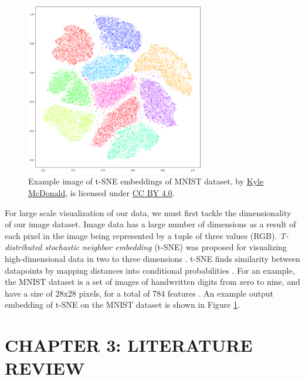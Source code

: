 \documentclass[12pt]{article}
\begin{document}
\begin{figure}[h]
    \centering
    \includegraphics[width=0.7\textwidth]{assets/images/tsne.png}
    \caption{Example image of t-SNE embeddings of MNIST dataset,
        by \href{https://www.flickr.com/photos/kylemcdonald/26620503329/}{Kyle
            McDonald}, is licensed under
        \href{https://creativecommons.org/licenses/by/4.0/}{CC BY 4.0}.}
    \label{fig:tsne}
\end{figure}

For large scale visualization of our data, we must first tackle the
dimensionality of our image dataset. Image data has a large number of dimensions
as a result of each pixel in the image being represented by a tuple of three
values (RGB). \textit{T-distributed stochastic neighbor embedding} (t-SNE) was
proposed for visualizing high-dimensional data in two to three dimensions
\cite{maaten_visualizing_2008}. t-SNE finds similarity between datapoints by
mapping distances into conditional probabilities \cite{maaten_visualizing_2008}.
For an example, the MNIST dataset is a set of images of handwritten digits from
zero to nine, and have a size of 28x28 pixels, for a total of 784 features
\cite{deng_mnist_2012}. An example output embedding of t-SNE on the
MNIST dataset is shown in Figure \ref{fig:tsne}.

\clearpage
\section{CHAPTER 3: LITERATURE REVIEW}
\end{document}
